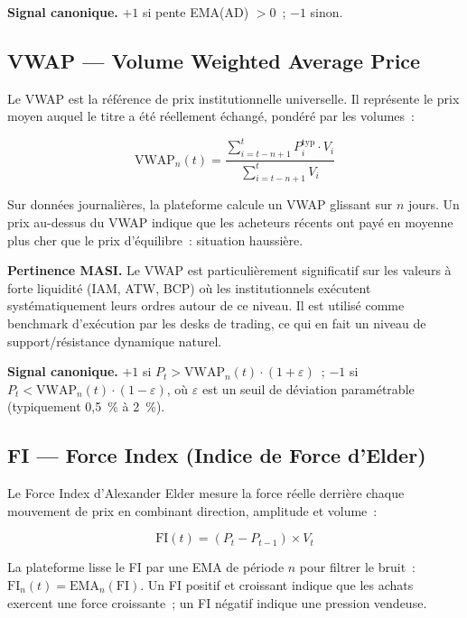 \textbf{Signal canonique.} $+1$ si pente EMA(AD) $> 0$~; $-1$ sinon.

\subsection{VWAP — Volume Weighted Average Price}

Le VWAP est la référence de prix institutionnelle universelle. Il représente le prix
moyen auquel le titre a été réellement échangé, pondéré par les volumes~:

\begin{equation}
    \text{VWAP}_n(t) = \frac{\displaystyle\sum_{i=t-n+1}^{t} P^{\text{typ}}_i \cdot V_i}
                             {\displaystyle\sum_{i=t-n+1}^{t} V_i}
    \label{eq:vwap}
\end{equation}

Sur données journalières, la plateforme calcule un VWAP glissant sur $n$ jours. Un prix
au-dessus du VWAP indique que les acheteurs récents ont payé en moyenne plus cher que
le prix d'équilibre~: situation haussière.

\textbf{Pertinence MASI.}
Le VWAP est particulièrement significatif sur les valeurs à forte liquidité (IAM, ATW,
BCP) où les institutionnels exécutent systématiquement leurs ordres autour de ce
niveau. Il est utilisé comme benchmark d'exécution par les desks de trading, ce qui
en fait un niveau de support/résistance dynamique naturel.

\textbf{Signal canonique.} $+1$ si $P_t > \text{VWAP}_n(t) \cdot (1 + \varepsilon)$~;
$-1$ si $P_t < \text{VWAP}_n(t) \cdot (1 - \varepsilon)$, où $\varepsilon$ est un seuil
de déviation paramétrable (typiquement 0{,}5~\% à 2~\%).

\subsection{FI — Force Index (Indice de Force d'Elder)}

Le Force Index d'Alexander Elder mesure la force réelle derrière chaque mouvement de
prix en combinant direction, amplitude et volume~:

\begin{equation}
    \text{FI}(t) = (P_t - P_{t-1}) \times V_t
    \label{eq:fi}
\end{equation}

La plateforme lisse le FI par une EMA de période $n$ pour filtrer le bruit~:
$\text{FI}_n(t) = \text{EMA}_n(\text{FI})$. Un FI positif et croissant indique que
les achats exercent une force croissante~; un FI négatif indique une pression vendeuse.

